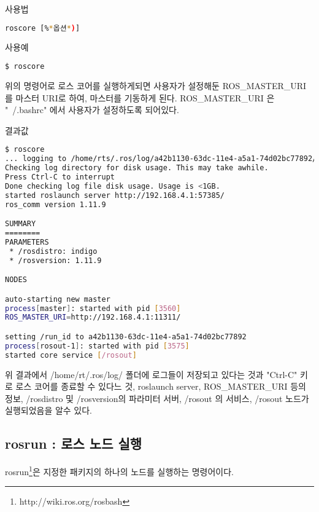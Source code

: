 \vspace{\baselineskip}
\noindent
{}\circled{\thenum} 사용법
\begin{lstlisting}[language=bash]
roscore [%*옵션*)]
\end{lstlisting}

\noindent
{}\circled{\thenum} 사용예
\begin{lstlisting}[language=bash]
$ roscore
\end{lstlisting}

\noindent
위의 명령어로 로스 코어를 실행하게되면 사용자가 설정해둔 ROS\_MASTER\_URI 를 마스터 URI로 하여, 마스터를 기동하게 된다. ROS\_MASTER\_URI 은 "~/.bashrc" 에서 사용자가 설정하도록 되어있다.

\vspace{\baselineskip}
\noindent
{}\circled{\thenum} 결과값
\begin{lstlisting}[language=bash]
$ roscore
... logging to /home/rts/.ros/log/a42b1130-63dc-11e4-a5a1-74d02bc77892/roslaunch-rts-3547.log
Checking log directory for disk usage. This may take awhile.
Press Ctrl-C to interrupt
Done checking log file disk usage. Usage is <1GB.
started roslaunch server http://192.168.4.1:57385/
ros_comm version 1.11.9

SUMMARY
========
PARAMETERS
 * /rosdistro: indigo
 * /rosversion: 1.11.9

NODES

auto-starting new master
process[master]: started with pid [3560]
ROS_MASTER_URI=http://192.168.4.1:11311/

setting /run_id to a42b1130-63dc-11e4-a5a1-74d02bc77892
process[rosout-1]: started with pid [3575]
started core service [/rosout]
\end{lstlisting}

\vspace{\baselineskip}
\noindent
위 결과에서 /home/rt/.ros/log/ 폴더에 로그들이 저장되고 있다는 것과 "Ctrl-C" 키로 로스 코어를 종료할 수 있다느 것, roslaunch server, ROS\_MASTER\_URI 등의 정보, /rosdistro 및 /rosversion의 파라미터 서버, /rosout 의 서비스, /rosout 노드가 실행되었음을 알수 있다.


\subsection{rosrun : 로스 노드 실행}

rosrun\footnote{http://wiki.ros.org/rosbash}은 지정한 패키지의 하나의 노드를 실행하는 명령어이다.


